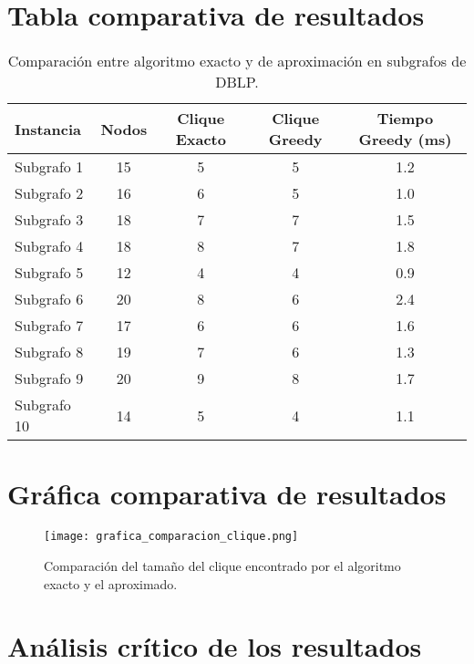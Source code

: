 \documentclass[12pt,a4paper]{report}
\begin{document}
\section{Tabla comparativa de resultados}

\begin{table}[H]
    \centering
    \caption{Comparación entre algoritmo exacto y de aproximación en subgrafos de DBLP.}
    \label{tab:comparativa}
    \begin{tabular}{@{}lcccc@{}}
        \toprule
        \textbf{Instancia} & \textbf{Nodos} & \textbf{Clique Exacto} & \textbf{Clique Greedy} & \textbf{Tiempo Greedy (ms)} \\
        \midrule
        Subgrafo 1 & 15 & 5 & 5 & 1.2 \\
        Subgrafo 2 & 16 & 6 & 5 & 1.0 \\
        Subgrafo 3 & 18 & 7 & 7 & 1.5 \\
        Subgrafo 4 & 18 & 8 & 7 & 1.8 \\
        Subgrafo 5 & 12 & 4 & 4 & 0.9 \\
        Subgrafo 6 & 20 & 8 & 6 & 2.4 \\
        Subgrafo 7 & 17 & 6 & 6 & 1.6 \\
        Subgrafo 8 & 19 & 7 & 6 & 1.3 \\
        Subgrafo 9 & 20 & 9 & 8 & 1.7 \\
        Subgrafo 10 & 14 & 5 & 4 & 1.1 \\
        \bottomrule
    \end{tabular}
\end{table}

\section{Gráfica comparativa de resultados}

\begin{figure}[H]
    \centering
    \texttt{[image: grafica\_comparacion\_clique.png]}
    \caption{Comparación del tamaño del clique encontrado por el algoritmo exacto y el aproximado.}
    \label{fig:grafica_comparacion}
\end{figure}

\section{Análisis crítico de los resultados}
\end{document}
